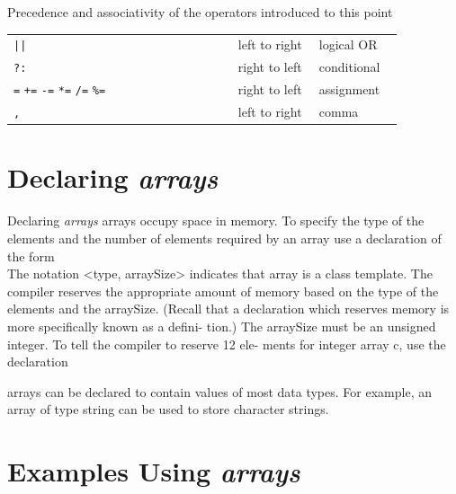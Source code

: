 \documentclass[10pt]{beamer}
\begin{document}
\begin{frame}{\footnotesize Precedence and associativity of the operators introduced to this point}
\begin{tabular}{p{0.5\linewidth} p{0.18\linewidth} p{0.18\linewidth}}
		\rowcolor{lightcyan} \texttt{||} & left to right & logical OR \\
		\rowcolor{lightcyan} \texttt{?:} & right to left & conditional \\
		\rowcolor{lightcyan} \texttt{=} \hspace{2pt} \texttt{+=} \hspace{2pt} \texttt{-=} \hspace{2pt} \texttt{*=} \hspace{2pt} \texttt{/=} \hspace{2pt} \texttt{\%=} & right to left & assignment \\
		\rowcolor{lightcyan} \texttt{,} & left to right & comma \\

	\end{tabular}
\end{frame}

\section{\texorpdfstring{Declaring \textbf{\textit{\color{lblue}arrays}}}{Declaring arrays}}
\begin{frame}{Declaring \textit{\color{blue}arrays}}
	arrays occupy space in memory. To specify the type of the elements and the number of
	elements required by an array use a declaration of the form \\
	
	The notation <type, arraySize> indicates that array is a class template. The compiler reserves
	the appropriate amount of memory based on the type of the elements and the arraySize.
	(Recall that a declaration which reserves memory is more specifically known as a defini-
	tion.) The arraySize must be an unsigned integer. To tell the compiler to reserve 12 ele-
	ments for integer array c, use the declaration
	
	arrays can be declared to contain values of most data types. For example, an array of type
	string can be used to store character strings.
\end{frame}

\section{\texorpdfstring{Examples Using \textbf{\textit{\color{lblue}arrays}}}{Examples Using arrays}}
\end{document}
